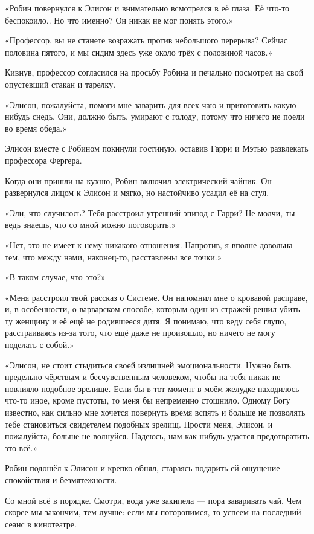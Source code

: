\documentclass[a4paper,12pt]{book}
\begin{document}
\par
«Робин повернулся к Элисон и внимательно всмотрелся в её глаза. Её что-то беспокоило.. Но что именно? Он никак не мог понять этого.»
\par
«Профессор, вы не станете возражать против небольшого перерыва? Сейчас половина пятого, и мы сидим здесь уже около трёх с половиной часов.»
\par
Кивнув, профессор согласился на просьбу Робина и печально посмотрел на свой опустевший стакан и тарелку.
\par
«Элисон, пожалуйста, помоги мне заварить для всех чаю и приготовить какую-нибудь снедь. Они, должно быть, умирают с голоду, потому что ничего не поели во время обеда.»
\par
Элисон вместе с Робином покинули гостиную, оставив Гарри и Мэтью развлекать профессора Фергера.
\par
Когда они пришли на кухню, Робин включил электрический чайник. Он развернулся лицом к Элисон и мягко, но настойчиво усадил её на стул.
\par
«Эли, что случилось? Тебя расстроил утренний эпизод с Гарри? Не молчи, ты ведь знаешь, что со мной можно поговорить.»
\par
«Нет, это не имеет к нему никакого отношения. Напротив, я вполне довольна тем, что между нами, наконец-то, расставлены все точки.»
\par
«В таком случае, что это?»
\par
«Меня расстроил твой рассказ о Системе. Он напомнил мне о кровавой расправе, и, в особенности, о варварском способе, которым один из стражей решил убить ту женщину и её ещё не родившееся дитя. Я понимаю, что веду себя глупо, расстраиваясь из-за того, что ещё даже не произошло, но ничего не могу поделать с собой.»
\par
«Элисон, не стоит стыдиться своей излишней эмоциональности. Нужно быть предельно чёрствым и бесчувственным человеком, чтобы на тебя никак не повлияло подобное зрелище. Если бы в тот момент в моём желудке находилось что-то иное, кроме пустоты, то меня бы непременно стошнило. Одному Богу известно, как сильно мне хочется повернуть время вспять и больше не позволять тебе становиться свидетелем подобных зрелищ. Прости меня, Элисон, и пожалуйста, больше не волнуйся. Надеюсь, нам как-нибудь удастся предотвратить это всё.»
\par
Робин подошёл к Элисон и крепко обнял, стараясь подарить ей ощущение спокойствия и безмятежности.
\par
Со мной всё в порядке. Смотри, вода уже закипела — пора заваривать чай. Чем скорее мы закончим, тем лучше: если мы поторопимся, то успеем на последний сеанс в кинотеатре.
\end{document}
